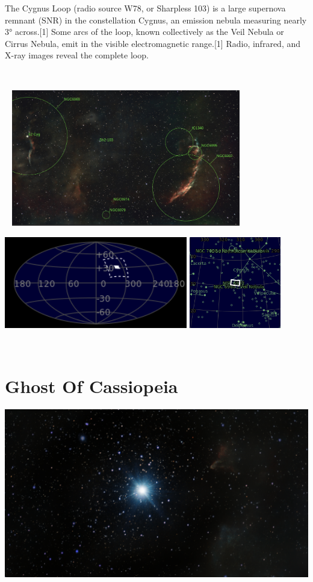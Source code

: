 {\footnotesize\color{white}
The Cygnus Loop (radio source W78, or Sharpless 103) is a large supernova remnant (SNR) in the constellation Cygnus, an emission nebula measuring nearly 3° across.[1] Some arcs of the loop, known collectively as the Veil Nebula or Cirrus Nebula, emit in the visible electromagnetic range.[1] Radio, infrared, and X-ray images reveal the complete loop.


}\ \\
\begin{center}
 \ \newpage
\includegraphics[width=0.75\textwidth]{../Imaging//Annotated/Full_Veil_Nebula_Annotated.jpg}

\includegraphics[height=4cm]{../Imaging//Annotated/Full_Veil_Nebula_Globe.jpg}
\includegraphics[height=4cm]{../Imaging//Annotated/Full_Veil_Nebula_Close.jpg}
\end{center}
\ \\\section{Ghost Of Cassiopeia}
\includegraphics[width=\textwidth]{../Imaging//Original/Ghost_Of_Cassiopeia.jpg}
